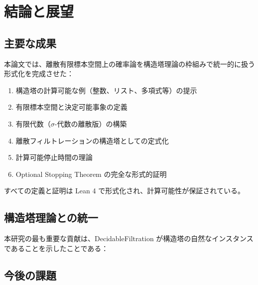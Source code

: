 \documentclass[a4paper,12pt]{ltjsarticle}
\theoremstyle{definition}
\begin{document}
\section{結論と展望}

\subsection{主要な成果}

本論文では、離散有限標本空間上の確率論を構造塔理論の枠組みで統一的に扱う形式化を完成させた：

\begin{enumerate}
\item 構造塔の計算可能な例（整数、リスト、多項式等）の提示
\item 有限標本空間と決定可能事象の定義
\item 有限代数（$\sigma$-代数の離散版）の構築
\item 離散フィルトレーションの構造塔としての定式化
\item 計算可能停止時間の理論
\item Optional Stopping Theorem の完全な形式的証明
\end{enumerate}

すべての定義と証明は Lean 4 で形式化され、計算可能性が保証されている。

\subsection{構造塔理論との統一}

本研究の最も重要な貢献は、DecidableFiltration が構造塔の自然なインスタンスであることを示したことである：

\begin{center}
\end{center}

\subsection{今後の課題}
\end{document}
